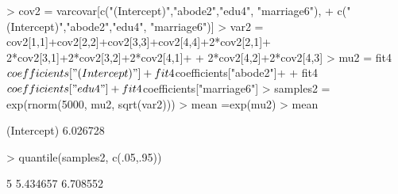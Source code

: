 \documentclass{article}
\begin{document}
\begin{Schunk}
\begin{Sinput}
> cov2 = varcovar[c("(Intercept)","abode2","edu4", "marriage6"), 
+               c("(Intercept)","abode2","edu4", "marriage6")]
> var2 = cov2[1,1]+cov2[2,2]+cov2[3,3]+cov2[4,4]+2*cov2[2,1]+ 2*cov2[3,1]+2*cov2[3,2]+2*cov2[4,1]+
+       2*cov2[4,2]+2*cov2[4,3]
> mu2 = fit4$coefficients["(Intercept)"] + fit4$coefficients["abode2"]+
+   fit4$coefficients["edu4"] +fit4$coefficients["marriage6"]
> samples2 = exp(rnorm(5000, mu2, sqrt(var2)))
> mean =exp(mu2)
> mean
\end{Sinput}
\begin{Soutput}
(Intercept) 
   6.026728 
\end{Soutput}
\begin{Sinput}
> quantile(samples2, c(.05,.95))
\end{Sinput}
\begin{Soutput}
      5%      95% 
5.434657 6.708552 
\end{Soutput}
\end{Schunk}
\end{document}
